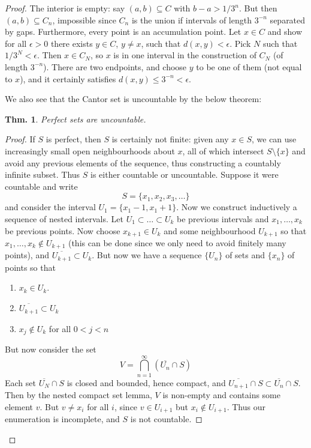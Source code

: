 \documentclass[12pt, a4paper]{book}
\newtheorem{theorem}{Thm.}[section]
\theoremstyle{nonumberplain}
\newtheorem{proof}{Proof}
\begin{document}
\begin{proof}
The interior is empty: say $(a,b)\subseteq C$ with $b-a>1/3^n$. But then $(a,b)\subseteq C_n$, impossible since $C_n$ is the
union if intervals of length $3^{-n}$ separated by gaps. Furthermore, every point is an accumulation point. Let $x\in C$ and
show for all $\epsilon>0$ there exists $y\in C$, $y\neq x$, such that $d(x,y)<\epsilon$. Pick $N$ such that $1/3^N<\epsilon$.
Then $x\in C_N$, so $x$ is in one interval in the construction of $C_N$ (of length $3^{-n}$). There are two endpoints,
and choose $y$ to be one of them (not equal to $x$), and it certainly satisfies $d(x,y)\leq 3^{-n}<\epsilon$.
\begin{center}
\end{center}
We also see that the Cantor set is uncountable by the below theorem:
\begin{theorem}
    Perfect sets are uncountable.
\end{theorem}
\begin{proof}
    If $S$ is perfect, then $S$ is certainly not finite: given any $x\in S$, we can use increasingly small open
    neighbourhoods about $x$, all of which intersect $S\setminus\{x\}$ and avoid any previous elements of the sequence,
    thus constructing a countably infinite subset. Thus $S$ is either countable or uncountable. Suppose it were countable
    and write
    \[S=\{x_1,x_2,x_3,\ldots\}\]
    and consider the interval $U_1=\{x_1-1,x_1+1\}$. Now we construct inductively a sequence of nested intervals. Let
    $U_1\subset\ldots\subset U_k$ be previous intervals and $x_1,\ldots,x_k$ be previous points. Now choose $x_{k+1}\in U_k$
    and some neighbourhood $U_{k+1}$ so that $x_1,\ldots,x_k\notin U_{k+1}$ (this can be done since we only need to
    avoid finitely many points), and $\overline{U_{k+1}}\subset U_k$. But now we have a sequence $\{U_n\}$ of sets
    and $\{x_n\}$ of points so that
    \begin{enumerate}
        \item $x_k\in U_k$.
        \item $\overline{U_{k+1}}\subset U_k$
        \item $x_j\notin U_k$ for all $0<j<n$
    \end{enumerate}
    But now consider the set
    \[V=\bigcap_{n=1}^\infty \left( \overline{U_n}\cap S \right)\]
    Each set $\overline{U_N}\cap S$ is closed and bounded, hence compact, and $\overline{U_{n+1}}\cap S\subset\overline{U_{n}}\cap S$.
    Then by the nested compact set lemma, $V$ is non-empty and contains some element $v$. But $v\neq x_i$ for all $i$,
    since $v\in U_{i+1}$ but $x_i\notin U_{i+1}$. Thus our enumeration is incomplete, and $S$ is not countable.
\end{proof}

\end{proof}
\end{document}
